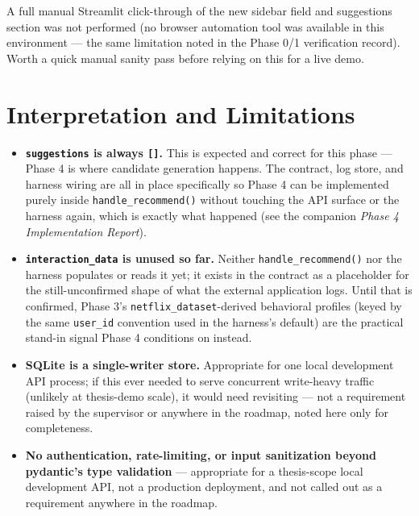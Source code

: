 \documentclass[11pt,a4paper]{article}
\newcommand{\code}[1]{\texttt{#1}}
\begin{document}
A full manual Streamlit click-through of the new sidebar field and suggestions section was not
performed (no browser automation tool was available in this environment --- the same limitation
noted in the Phase 0/1 verification record). Worth a quick manual sanity pass before relying on
this for a live demo.

\section{Interpretation and Limitations}
\label{sec:limits}

\begin{itemize}
    \item \textbf{\code{suggestions} is always \code{[]}.} This is expected and correct for this
        phase --- Phase 4 is where candidate generation happens. The contract, log store, and
        harness wiring are all in place specifically so Phase 4 can be implemented purely inside
        \code{handle\_recommend()} without touching the API surface or the harness again, which is
        exactly what happened (see the companion \emph{Phase 4 Implementation Report}).
    \item \textbf{\code{interaction\_data} is unused so far.} Neither \code{handle\_recommend()}
        nor the harness populates or reads it yet; it exists in the contract as a placeholder for
        the still-unconfirmed shape of what the external application logs. Until that is
        confirmed, Phase 3's \code{netflix\_dataset}-derived behavioral profiles (keyed by the
        same \code{user\_id} convention used in the harness's default) are the practical stand-in
        signal Phase 4 conditions on instead.
    \item \textbf{SQLite is a single-writer store.} Appropriate for one local development API
        process; if this ever needed to serve concurrent write-heavy traffic (unlikely at
        thesis-demo scale), it would need revisiting --- not a requirement raised by the
        supervisor or anywhere in the roadmap, noted here only for completeness.
    \item \textbf{No authentication, rate-limiting, or input sanitization beyond pydantic's type
        validation} --- appropriate for a thesis-scope local development API, not a production
        deployment, and not called out as a requirement anywhere in the roadmap.
\end{itemize}
\end{document}
